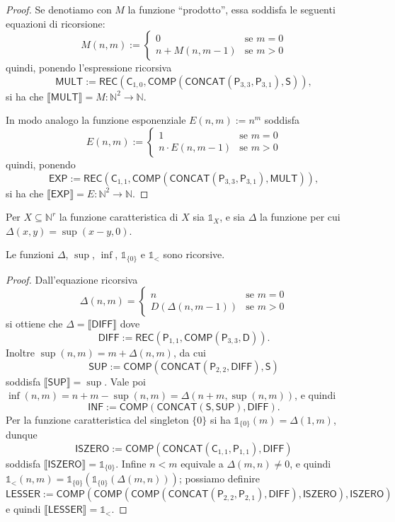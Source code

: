 \begin{proof}
Se denotiamo con $M$ la funzione ``prodotto'', essa soddisfa le seguenti equazioni di ricorsione:
\[
M(n,m):=\begin{cases}0 & \text{se } m=0\\ n+M(n,m-1) & \text{se } m>0\end{cases}
\]
quindi, ponendo l'espressione ricorsiva
\[
\mathsf{MULT}:=\mathsf{REC}(\mathsf C_{1,0},\mathsf{COMP}(\mathsf{CONCAT}(\mathsf P_{3,3},\mathsf P_{3,1}),\mathsf S)),
\]
si ha che $\llbracket\mathsf{MULT}\rrbracket=M\colon\mathbb N^2\to\mathbb N$.

In modo analogo la funzione esponenziale $E(n,m):=n^m$ soddisfa
\[
E(n,m):=\begin{cases}1 & \text{se } m=0\\ n\cdot E(n,m-1) & \text{se } m>0\end{cases}
\]
quindi, ponendo
\[
\mathsf{EXP}:=\mathsf{REC}(\mathsf C_{1,1},\mathsf{COMP}(\mathsf{CONCAT}(\mathsf P_{3,3},\mathsf P_{3,1}),\mathsf{MULT})),
\]
si ha che $\llbracket\mathsf{EXP}\rrbracket=E\colon\mathbb N^2\to\mathbb N$.
\end{proof}

Per $X\subseteq\mathbb N^r$ la funzione caratteristica di $X$ sia $\mathbb 1_X$, e sia $\Delta$ la funzione per cui $\Delta(x,y)=\sup(x-y,0)$.

\begin{lemm}
Le funzioni $\Delta$, $\sup$, $\inf$, $\mathbb 1_{\{0\}}$ e $\mathbb 1_{<}$ sono ricorsive.
\end{lemm}

\begin{proof}
Dall'equazione ricorsiva
\[
\Delta(n,m)=
\begin{cases}
n & \text{se } m=0\\
D(\Delta(n,m-1)) & \text{se } m>0
\end{cases}
\]
si ottiene che $\Delta=\llbracket\mathsf{DIFF}\rrbracket$ dove
\[
\mathsf{DIFF}:=\mathsf{REC}(\mathsf P_{1,1},\mathsf{COMP}(\mathsf P_{3,3},\mathsf D)).
\]
Inoltre $\sup(n,m)=m+\Delta(n,m)$, da cui
\[
\mathsf{SUP}:=\mathsf{COMP}(\mathsf{CONCAT}(\mathsf P_{2,2},\mathsf{DIFF}),\mathsf S)
\]
soddisfa $\llbracket\mathsf{SUP}\rrbracket=\sup$. Vale poi $\inf(n,m)=n+m-\sup(n,m)=\Delta(n+m,\sup(n,m))$, e quindi
\[
\mathsf{INF}:=\mathsf{COMP}(\mathsf{CONCAT}(\mathsf S,\mathsf{SUP}),\mathsf{DIFF}).
\]
Per la funzione caratteristica del singleton $\{0\}$ si ha $\mathbb 1_{\{0\}}(m)=\Delta(1,m)$, dunque
\[
\mathsf{ISZERO}:=\mathsf{COMP}(\mathsf{CONCAT}(\mathsf C_{1,1},\mathsf P_{1,1}),\mathsf{DIFF})
\]
soddisfa $\llbracket\mathsf{ISZERO}\rrbracket=\mathbb 1_{\{0\}}$.
Infine $n<m$ equivale a $\Delta(m,n)\neq0$, e quindi $\mathbb 1_{<}(n,m)=\mathbb 1_{\{0\}}(\mathbb 1_{\{0\}}(\Delta(m,n)))$; possiamo definire
\[
\mathsf{LESSER}:=\mathsf{COMP}(\mathsf{COMP}(\mathsf{COMP}(\mathsf{CONCAT}(\mathsf P_{2,2},\mathsf P_{2,1}),\mathsf{DIFF}),\mathsf{ISZERO}),\mathsf{ISZERO})
\]
e quindi $\llbracket\mathsf{LESSER}\rrbracket=\mathbb 1_{<}$.
\end{proof}


